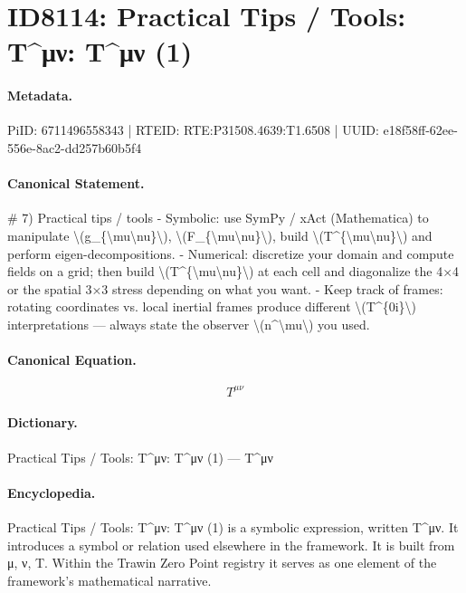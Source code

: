 \section*{ID8114: Practical Tips / Tools: T\textasciicircum{}μν: T\textasciicircum{}μν (1)}
\paragraph{Metadata.}
PiID: 6711496558343 | RTEID: RTE:P31508.4639:T1.6508 | UUID: e18f58ff-62ee-556e-8ac2-dd257b60b5f4

\paragraph{Canonical Statement.}
\# 7) Practical tips / tools - Symbolic: use SymPy / xAct (Mathematica) to manipulate \textbackslash{}(g\_\{\textbackslash{}mu\textbackslash{}nu\}\textbackslash{}), \textbackslash{}(F\_\{\textbackslash{}mu\textbackslash{}nu\}\textbackslash{}), build \textbackslash{}(T\textasciicircum{}\{\textbackslash{}mu\textbackslash{}nu\}\textbackslash{}) and perform eigen-decompositions. - Numerical: discretize your domain and compute fields on a grid; then build \textbackslash{}(T\textasciicircum{}\{\textbackslash{}mu\textbackslash{}nu\}\textbackslash{}) at each cell and diagonalize the 4×4 or the spatial 3×3 stress depending on what you want. - Keep track of frames: rotating coordinates vs. local inertial frames produce different \textbackslash{}(T\textasciicircum{}\{0i\}\textbackslash{}) interpretations — always state the observer \textbackslash{}(n\textasciicircum{}\textbackslash{}mu\textbackslash{}) you used.

\paragraph{Canonical Equation.}
\[
T^{\mu\nu}
\]

\paragraph{Dictionary.}
Practical Tips / Tools: T\textasciicircum{}μν: T\textasciicircum{}μν (1) — T\textasciicircum{}μν

\paragraph{Encyclopedia.}
Practical Tips / Tools: T\textasciicircum{}μν: T\textasciicircum{}μν (1) is a symbolic expression, written T\textasciicircum{}μν. It introduces a symbol or relation used elsewhere in the framework. It is built from μ, ν, T. Within the Trawin Zero Point registry it serves as one element of the framework's mathematical narrative.

